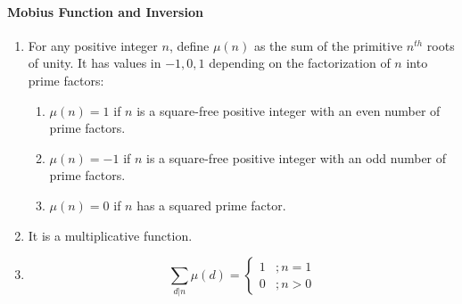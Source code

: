 \paragraph{Mobius Function and Inversion}\begin{enumerate}

            
            \item For any positive integer $n$, define $\displaystyle \mu(n)$ as the sum of the primitive $n^{th}$ roots
                of
                unity.
                It has values in $\displaystyle {-1, 0, 1}$ depending on the factorization of $n$ into prime factors:
                \begin{enumerate}

                    \item $\displaystyle \mu(n)=1$ if $n$ is a square-free positive integer with an even number of prime
                        factors.
                    
                    \item $\displaystyle \mu(n)=-1$ if $n$ is a square-free positive integer with an odd number of prime
                        factors.
                    
                    \item $\displaystyle \mu(n)=0$ if $n$ has a squared prime factor.
                \end{enumerate}

            
            \item It is a multiplicative function.
            \item 
                \[\sum_{d|n}\mu(d) =
                \begin{cases}
                1 & ; n=1\\
                0 & ; n > 0
                \end{cases}\]
            

\end{enumerate}
